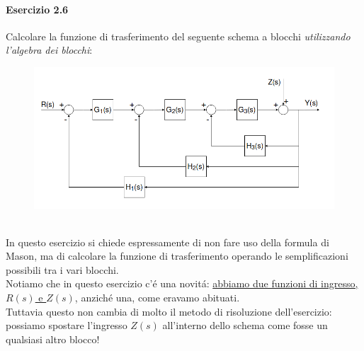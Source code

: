 \documentclass[12pt,a4paper]{article}
\begin{document}
	\paragraph*{Esercizio 2.6} Calcolare la funzione di trasferimento del seguente schema a blocchi \textit{utilizzando l'algebra dei blocchi}:
	\begin{figure}[h!]
		\centering
		\includegraphics[scale=0.5]{./images/schema26.png}
	\end{figure}
	\\ In questo esercizio si chiede espressamente di non fare uso della formula di Mason, ma di calcolare la funzione di trasferimento operando le semplificazioni possibili tra i vari blocchi.\\
	Notiamo che in questo esercizio c'\'e una novit\'a: \underline{abbiamo due funzioni di ingresso, $R(s)$ e $Z(s)$}, anzich\'e una, come eravamo abituati.\\
	Tuttavia questo non cambia di molto il metodo di risoluzione dell'esercizio: possiamo spostare l'ingresso $Z(s)$ all'interno dello schema come fosse un qualsiasi altro blocco!
\end{document}

